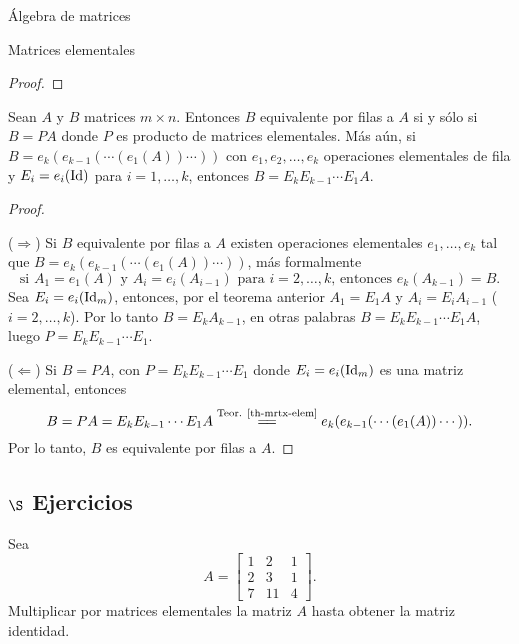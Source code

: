 \begin{chapter}{\'Algebra de matrices}
\begin{section}{Matrices elementales}
\begin{proof}
    
            \end{proof}
            
            
            
            
            \begin{corolario}\label{coro-mrtx-elem}
                Sean $A$ y $B$ matrices $m \times n$. Entonces $B$ equivalente por filas a $A$ si y sólo si $B=PA$ donde $P$ es  producto de matrices elementales. Más aún, si $B = e_k(e_{k-1}(\cdots(e_1(A))\cdots))$ con $e_1,e_2,\ldots,e_k$ operaciones elementales de fila y $E_i=e_i(\operatorname{Id})$ para $i=1,\ldots,k$,  entonces $B =  E_kE_{k-1}\cdots E_1A$.
            \end{corolario}
            \begin{proof} 
                \
                
                ($\Rightarrow$) Si $B$ equivalente por filas a $A$  existen operaciones elementales $e_1,\ldots,e_k$ tal que $B = e_k(e_{k-1}(\cdots(e_1(A))\cdots))$, más formalmente
                \begin{equation*}
                \text{si } A_1 = e_1(A)\text{ y } A_i = e_i(A_{i-1})\text{ para }i=2,\ldots,k\text{, entonces } e_k(A_{k-1})= B.
                \end{equation*}
                Sea $E_i = e_i(\operatorname{Id}_m)$, entonces, por el teorema anterior $A_1= E_1A$ y $A_i = E_iA_{i-1}$ ($i=2,\ldots,k$). Por  lo tanto $B=E_kA_{k-1}$, en otras palabras $B =  E_kE_{k-1}\cdots E_1A$, luego $P = E_kE_{k-1}\cdots E_1$.
                
                ($\Leftarrow$) Si $B= PA$, con  $P = E_kE_{k-1}\cdots E_1$ donde $E_i=e_i(\operatorname{Id}_m)$ es una matriz elemental,  entonces
                $$
                B = PA = E_kE_{k-1}\cdots E_1A \stackrel{\text{Teor. \ref{th-mrtx-elem}}}{=\joinrel=}  e_k(e_{k-1}(\cdots(e_1(A))\cdots)). 
                $$
                Por lo tanto, $B$ es equivalente por filas a $A$.
            \end{proof} 
            
            \subsection*{$\S$ Ejercicios}
            \begin{enumex}
                \item Sea 
                $$
                A = \begin{bmatrix}
                    1&2&1 \\2&3&1 \\7&11&4
                \end{bmatrix}.
                $$
                Multiplicar por matrices elementales la matriz $A$ hasta obtener la matriz identidad.


\end{enumex}
\end{section}
\end{chapter}
